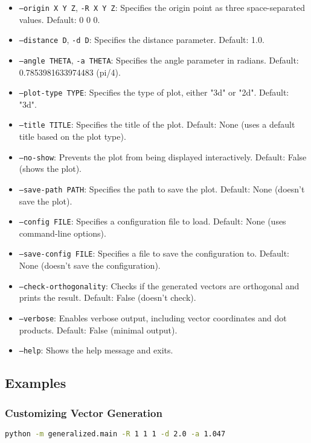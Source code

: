 \begin{itemize}
    \item \texttt{--origin X Y Z}, \texttt{-R X Y Z}: Specifies the origin point as three space-separated values. Default: 0 0 0.
    \item \texttt{--distance D}, \texttt{-d D}: Specifies the distance parameter. Default: 1.0.
    \item \texttt{--angle THETA}, \texttt{-a THETA}: Specifies the angle parameter in radians. Default: 0.7853981633974483 (pi/4).
    \item \texttt{--plot-type TYPE}: Specifies the type of plot, either "3d" or "2d". Default: "3d".
    \item \texttt{--title TITLE}: Specifies the title of the plot. Default: None (uses a default title based on the plot type).
    \item \texttt{--no-show}: Prevents the plot from being displayed interactively. Default: False (shows the plot).
    \item \texttt{--save-path PATH}: Specifies the path to save the plot. Default: None (doesn't save the plot).
    \item \texttt{--config FILE}: Specifies a configuration file to load. Default: None (uses command-line options).
    \item \texttt{--save-config FILE}: Specifies a file to save the configuration to. Default: None (doesn't save the configuration).
    \item \texttt{--check-orthogonality}: Checks if the generated vectors are orthogonal and prints the result. Default: False (doesn't check).
    \item \texttt{--verbose}: Enables verbose output, including vector coordinates and dot products. Default: False (minimal output).
    \item \texttt{--help}: Shows the help message and exits.
\end{itemize}

\subsection{Examples}

\subsubsection{Customizing Vector Generation}

\begin{lstlisting}[language=bash]
python -m generalized.main -R 1 1 1 -d 2.0 -a 1.047
\end{lstlisting}

